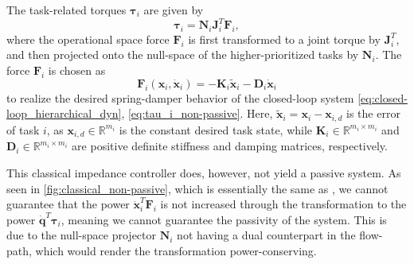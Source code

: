\documentclass[../main.tex]{subfiles}
\begin{document}
The task-related torques $\bm{\tau}_i$ are given by
\begin{equation} \label{eq:tau_i_non-passive}
    \bm{\tau}_{i} = \bm{N}_i\bm{J}_i^T\bm{F}_i,
\end{equation}
where the operational space force $\bm{F}_i$ is first transformed to a joint torque by $\bm{J}_i^T$, and then projected onto the null-space of the higher-prioritized tasks by $\bm{N}_i$. The force $\bm{F}_i$ is chosen as
\begin{equation} \label{eq:F_i}
    \bm{F}_{i}(\bm{x}_i, \dot{\bm{x}}_i)=-\bm{K}_{i}\tilde{\bm{x}}_{i} - \bm{D}_{i}\dot{\bm{x}}_{i}
\end{equation}
to realize the desired spring-damper behavior of the closed-loop system \eqref{eq:closed-loop_hierarchical_dyn}, \eqref{eq:tau_i_non-passive}. Here, $\tilde{\bm{x}}_{i} = \bm{x}_{i} - \bm{x}_{i,d}$ is the error of task $i$, as $\bm{x}_{i,d} \in \mathbb{R}^{m_i}$ is the constant desired task state, while $\bm{K}_{i} \in \mathbb{R}^{m_i\times m_i}$ and $\bm{D}_{i} \in \mathbb{R}^{m_i\times m_i}$ are positive definite stiffness and damping matrices, respectively.

This classical impedance controller does, however, not yield a passive system. As seen in \cref{fig:classical_non-passive}, which is essentially the same as \cite[Fig.~1]{dietrichPassivationProjectionBasedNull2016}, we cannot guarantee that the power $\dot{\bm{x}}_i^T\bm{F}_i$ is not increased through the transformation to the power $\dot{\bm{q}}^T\bm{\tau}_i$, meaning we cannot guarantee the passivity of the system. This is due to the null-space projector $\bm{N}_i$ not having a dual counterpart in the flow-path, which would render the transformation power-conserving. 
\end{document}
